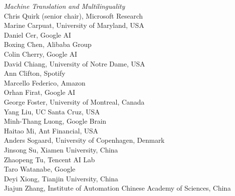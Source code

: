 \emph{Machine Translation and Multilinguality} \\
\hspace*{0.2in}Chris Quirk (senior chair), Microsoft Research \\
\hspace*{0.2in}Marine Carpuat, University of Maryland, USA \\
\hspace*{0.2in}Daniel Cer, Google AI \\
\hspace*{0.2in}Boxing Chen, Alibaba Group \\
\hspace*{0.2in}Colin Cherry, Google AI \\
\hspace*{0.2in}David Chiang, University of Notre Dame, USA \\
\hspace*{0.2in}Ann Clifton, Spotify \\
\hspace*{0.2in}Marcello Federico, Amazon \\
\hspace*{0.2in}Orhan Firat, Google AI \\
\hspace*{0.2in}George Foster, University of Montreal, Canada \\
\hspace*{0.2in}Yang Liu, UC Santa Cruz, USA \\
\hspace*{0.2in}Minh-Thang Luong, Google Brain \\
\hspace*{0.2in}Haitao Mi, Ant Financial, USA \\
\hspace*{0.2in}Anders Sogaard, University of Copenhagen, Denmark \\
\hspace*{0.2in}Jinsong Su, Xiamen University, China \\
\hspace*{0.2in}Zhaopeng Tu, Tencent AI Lab \\
\hspace*{0.2in}Taro Watanabe, Google \\
\hspace*{0.2in}Deyi Xiong, Tianjin University, China \\
\hspace*{0.2in}Jiajun Zhang, Institute of Automation Chinese Academy of Sciences, China


